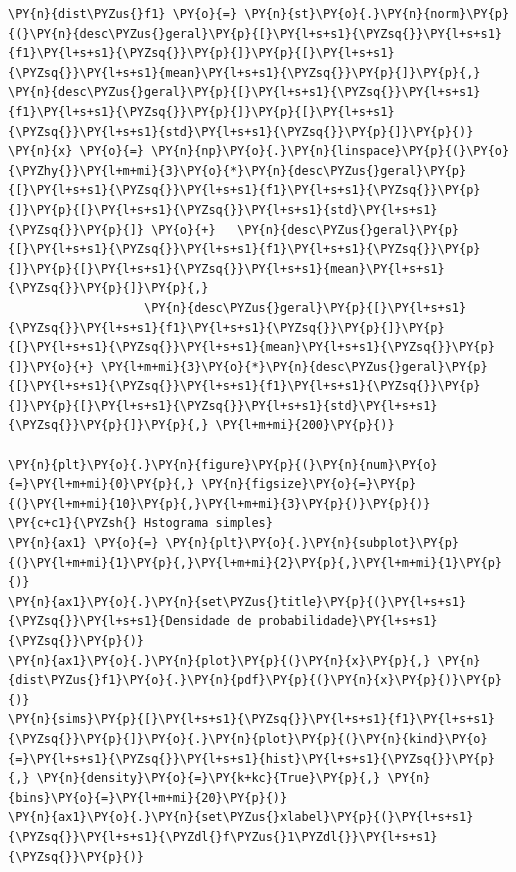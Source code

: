     \begin{tcolorbox}[breakable, size=fbox, boxrule=1pt, pad at break*=1mm,colback=cellbackground, colframe=cellborder]
\begin{Verbatim}[commandchars=\\\{\}]
\PY{n}{dist\PYZus{}f1} \PY{o}{=} \PY{n}{st}\PY{o}{.}\PY{n}{norm}\PY{p}{(}\PY{n}{desc\PYZus{}geral}\PY{p}{[}\PY{l+s+s1}{\PYZsq{}}\PY{l+s+s1}{f1}\PY{l+s+s1}{\PYZsq{}}\PY{p}{]}\PY{p}{[}\PY{l+s+s1}{\PYZsq{}}\PY{l+s+s1}{mean}\PY{l+s+s1}{\PYZsq{}}\PY{p}{]}\PY{p}{,} \PY{n}{desc\PYZus{}geral}\PY{p}{[}\PY{l+s+s1}{\PYZsq{}}\PY{l+s+s1}{f1}\PY{l+s+s1}{\PYZsq{}}\PY{p}{]}\PY{p}{[}\PY{l+s+s1}{\PYZsq{}}\PY{l+s+s1}{std}\PY{l+s+s1}{\PYZsq{}}\PY{p}{]}\PY{p}{)}
\PY{n}{x} \PY{o}{=} \PY{n}{np}\PY{o}{.}\PY{n}{linspace}\PY{p}{(}\PY{o}{\PYZhy{}}\PY{l+m+mi}{3}\PY{o}{*}\PY{n}{desc\PYZus{}geral}\PY{p}{[}\PY{l+s+s1}{\PYZsq{}}\PY{l+s+s1}{f1}\PY{l+s+s1}{\PYZsq{}}\PY{p}{]}\PY{p}{[}\PY{l+s+s1}{\PYZsq{}}\PY{l+s+s1}{std}\PY{l+s+s1}{\PYZsq{}}\PY{p}{]} \PY{o}{+}   \PY{n}{desc\PYZus{}geral}\PY{p}{[}\PY{l+s+s1}{\PYZsq{}}\PY{l+s+s1}{f1}\PY{l+s+s1}{\PYZsq{}}\PY{p}{]}\PY{p}{[}\PY{l+s+s1}{\PYZsq{}}\PY{l+s+s1}{mean}\PY{l+s+s1}{\PYZsq{}}\PY{p}{]}\PY{p}{,} 
                   \PY{n}{desc\PYZus{}geral}\PY{p}{[}\PY{l+s+s1}{\PYZsq{}}\PY{l+s+s1}{f1}\PY{l+s+s1}{\PYZsq{}}\PY{p}{]}\PY{p}{[}\PY{l+s+s1}{\PYZsq{}}\PY{l+s+s1}{mean}\PY{l+s+s1}{\PYZsq{}}\PY{p}{]}\PY{o}{+} \PY{l+m+mi}{3}\PY{o}{*}\PY{n}{desc\PYZus{}geral}\PY{p}{[}\PY{l+s+s1}{\PYZsq{}}\PY{l+s+s1}{f1}\PY{l+s+s1}{\PYZsq{}}\PY{p}{]}\PY{p}{[}\PY{l+s+s1}{\PYZsq{}}\PY{l+s+s1}{std}\PY{l+s+s1}{\PYZsq{}}\PY{p}{]}\PY{p}{,} \PY{l+m+mi}{200}\PY{p}{)}

\PY{n}{plt}\PY{o}{.}\PY{n}{figure}\PY{p}{(}\PY{n}{num}\PY{o}{=}\PY{l+m+mi}{0}\PY{p}{,} \PY{n}{figsize}\PY{o}{=}\PY{p}{(}\PY{l+m+mi}{10}\PY{p}{,}\PY{l+m+mi}{3}\PY{p}{)}\PY{p}{)}
\PY{c+c1}{\PYZsh{} Hstograma simples}
\PY{n}{ax1} \PY{o}{=} \PY{n}{plt}\PY{o}{.}\PY{n}{subplot}\PY{p}{(}\PY{l+m+mi}{1}\PY{p}{,}\PY{l+m+mi}{2}\PY{p}{,}\PY{l+m+mi}{1}\PY{p}{)}
\PY{n}{ax1}\PY{o}{.}\PY{n}{set\PYZus{}title}\PY{p}{(}\PY{l+s+s1}{\PYZsq{}}\PY{l+s+s1}{Densidade de probabilidade}\PY{l+s+s1}{\PYZsq{}}\PY{p}{)}
\PY{n}{ax1}\PY{o}{.}\PY{n}{plot}\PY{p}{(}\PY{n}{x}\PY{p}{,} \PY{n}{dist\PYZus{}f1}\PY{o}{.}\PY{n}{pdf}\PY{p}{(}\PY{n}{x}\PY{p}{)}\PY{p}{)}
\PY{n}{sims}\PY{p}{[}\PY{l+s+s1}{\PYZsq{}}\PY{l+s+s1}{f1}\PY{l+s+s1}{\PYZsq{}}\PY{p}{]}\PY{o}{.}\PY{n}{plot}\PY{p}{(}\PY{n}{kind}\PY{o}{=}\PY{l+s+s1}{\PYZsq{}}\PY{l+s+s1}{hist}\PY{l+s+s1}{\PYZsq{}}\PY{p}{,} \PY{n}{density}\PY{o}{=}\PY{k+kc}{True}\PY{p}{,} \PY{n}{bins}\PY{o}{=}\PY{l+m+mi}{20}\PY{p}{)}
\PY{n}{ax1}\PY{o}{.}\PY{n}{set\PYZus{}xlabel}\PY{p}{(}\PY{l+s+s1}{\PYZsq{}}\PY{l+s+s1}{\PYZdl{}f\PYZus{}1\PYZdl{}}\PY{l+s+s1}{\PYZsq{}}\PY{p}{)}


\end{Verbatim}
\end{tcolorbox}
